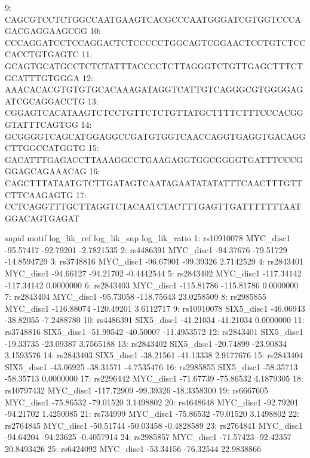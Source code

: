 \documentclass[a4paper,10pt]{article}
\begin{document}
\begin{Schunk}
\begin{Soutput}
 9: CAGCGTCCTCTGGCCAATGAAGTCACGCCCAATGGGATCGTGGTCCCAGACGAGGAAGCGG
10: CCCAGGATCCTCCAGGACTCTCCCCCTGGCAGTCGGAACTCCTGTCTCCCACCTGTGAGTC
11: GCAGTGCATGCCTCTCTATTTACCCCTCTTAGGGTCTGTTGAGCTTTCTGCATTTGTGGGA
12: AAACACACGTGTGTGCACAAAGATAGGTCATTGTCAGGGCGTGGGGAGATCGCAGGACCTG
13: CGGAGTCACATAAGTCTCCTGTTCTCTGTTATGCTTTTCTTTCCCACGGGTATTTCAGTGG
14: GCGGGGTCAGCATGGAGGCCGATGTGGTCAACCAGGTGAGGTGACAGGCTTGGCCATGGTG
15: GACATTTGAGACCTTAAAGGCCTGAAGAGGTGGCGGGGTGATTTCCCGGGAGCAGAAACAG
16: CAGCTTTATAATGTCTTGATAGTCAATAGAATATATATTTCAACTTTGTTCTTCAAGAGTG
17: CCTCAGGTTTGCTTAGGTCTACAATCTACTTTGAGTTGATTTTTTTAATGGACAGTGAGAT
\end{Soutput}
\begin{Soutput}
         snpid      motif log_lik_ref log_lik_snp log_lik_ratio
 1: rs10910078  MYC_disc1   -95.57417   -92.79201    -2.7821535
 2:  rs4486391  MYC_disc1   -94.37676   -79.51729   -14.8594729
 3:  rs3748816  MYC_disc1   -96.67901   -99.39326     2.7142529
 4:  rs2843401  MYC_disc1   -94.66127   -94.21702    -0.4442544
 5:  rs2843402  MYC_disc1  -117.34142  -117.34142     0.0000000
 6:  rs2843403  MYC_disc1  -115.81786  -115.81786     0.0000000
 7:  rs2843404  MYC_disc1   -95.73058  -118.75643    23.0258509
 8:  rs2985855  MYC_disc1  -116.88074  -120.49201     3.6112717
 9: rs10910078 SIX5_disc1   -46.06943   -38.82055    -7.2488780
10:  rs4486391 SIX5_disc1   -41.21034   -41.21034     0.0000000
11:  rs3748816 SIX5_disc1   -51.99542   -40.50007   -11.4953572
12:  rs2843401 SIX5_disc1   -19.33735   -23.09387     3.7565188
13:  rs2843402 SIX5_disc1   -20.74899   -23.90834     3.1593576
14:  rs2843403 SIX5_disc1   -38.21561   -41.13338     2.9177676
15:  rs2843404 SIX5_disc1   -43.06925   -38.31571    -4.7535476
16:  rs2985855 SIX5_disc1   -58.35713   -58.35713     0.0000000
17:  rs2296442  MYC_disc1   -71.67739   -75.86532     4.1879305
18: rs10797432  MYC_disc1  -117.72909   -99.39326   -18.3358300
19:  rs6667605  MYC_disc1   -75.86532   -79.01520     3.1498802
20:  rs4648648  MYC_disc1   -92.79201   -94.21702     1.4250085
21:   rs734999  MYC_disc1   -75.86532   -79.01520     3.1498802
22:  rs2764845  MYC_disc1   -50.51744   -50.03458    -0.4828589
23:  rs2764841  MYC_disc1   -94.64204   -94.23625    -0.4057914
24:  rs2985857  MYC_disc1   -71.57423   -92.42357    20.8493426
25:  rs6424092  MYC_disc1   -53.34156   -76.32544    22.9838866

\end{Soutput}
\end{Schunk}
\end{document}
